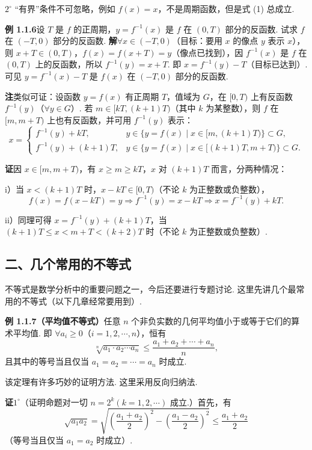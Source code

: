 \documentclass[UTF8,12pt,a4paper,fontset=fandol]{ctexart}
\begin{document}
$2^\circ$ “有界”条件不可忽略，例如 $f(x)=x$，不是周期函数，但是式 (1) 总成立.

\noindent\textbf{例 1.1.6}\quad 设 $T$ 是 $f$ 的正周期，$y=f^{-1}(x)$ 是 $f$ 在 $(0,T)$ 部分的反函数. 试求 $f$ 在 $(-T,0)$ 部分的反函数.
\noindent\textbf{解}\quad $\forall x\in(-T,0)$（目标：要用 $x$ 的像点 $y$ 表示 $x$），则 $x+T\in(0,T)$，$f(x)=f(x+T)=y$（像点已找到），因 $f^{-1}(x)$ 是 $f$ 在 $(0,T)$ 上的反函数，所以 $f^{-1}(y)=x+T$. 即 $x=f^{-1}(y)-T$（目标已达到）. 可见 $y=f^{-1}(x)-T$ 是 $f(x)$ 在 $(-T,0)$ 部分的反函数.

\noindent\textbf{注}\quad 类似可证：设函数 $y=f(x)$ 有正周期 $T$，值域为 $G$，在 $[0,T)$ 上有反函数 $f^{-1}(y)$（$\forall y\in G$）. 若 $m\in[kT,(k+1)T)$（其中 $k$ 为某整数），则 $f$ 在 $[m,m+T)$ 上也有反函数，并可用 $f^{-1}(y)$ 表示：
\[
x=
\begin{cases}
f^{-1}(y)+kT, & y\in\{y=f(x)\mid x\in[m,(k+1)T)\}\subset G,\\
f^{-1}(y)+(k+1)T, & y\in\{y=f(x)\mid x\in[(k+1)T,m+T)\}\subset G.
\end{cases}
\]

\noindent\textbf{证}\quad 因 $x\in[m,m+T)$，有 $x\ge m\ge kT$，$x$ 对 $(k+1)T$ 而言，分两种情况：

i）当 $x<(k+1)T$ 时，$x-kT\in[0,T)$（不论 $k$ 为正整数或负整数），
\[
  f(x)=f(x-kT)=y\Rightarrow f^{-1}(y)=x-kT\Rightarrow x=f^{-1}(y)+kT.
\]

ii）同理可得 $x=f^{-1}(y)+(k+1)T$，当 $(k+1)T\le x<m+T<(k+2)T$ 时（不论 $k$ 为正整数或负整数）.

\subsection*{二、几个常用的不等式}

不等式是数学分析中的重要问题之一，今后还要进行专题讨论. 这里先讲几个最常用的不等式（以下几章经常要用到）.

\noindent\textbf{例 1.1.7（平均值不等式）}\quad 任意 $n$ 个非负实数的几何平均值小于或等于它们的算术平均值. 即 $\forall a_i\ge0$（$i=1,2,\cdots,n$），恒有
\[
  \sqrt[n]{a_1\cdot a_2\cdots a_n}\le\frac{a_1+a_2+\cdots+a_n}{n},
\tag{1}
\]
且其中的等号当且仅当 $a_1=a_2=\cdots=a_n$ 时成立.

该定理有许多巧妙的证明方法. 这里采用反向归纳法.

\noindent\textbf{证}\quad $1^\circ$（证明命题对一切 $n=2^k(k=1,2,\cdots)$ 成立.）首先，有
\[
  \sqrt{a_1a_2}=
  \sqrt{\left(\frac{a_1+a_2}{2}\right)^2-\left(\frac{a_1-a_2}{2}\right)^2}
  \le \frac{a_1+a_2}{2}
\tag{2}
\]
（等号当且仅当 $a_1=a_2$ 时成立）.
\end{document}
